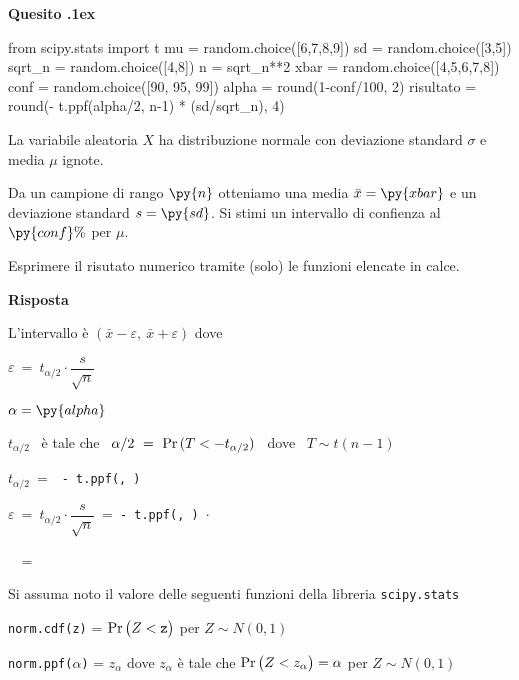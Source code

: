\documentclass[11pt,twoside,a4paper]{article}
\def\Pr{{\rm Pr\,}}
\newcounter{quesito}
\newenvironment{question}{\addtocounter{quesito}{1}\bigskip\bigskip\par\textbf{Quesito \thequesito.\kern1ex}}{\vspace{\parskip}}
\newenvironment{answer}{\par\textbf{Risposta\quad}}{\vspace{\parskip}}
\begin{document}
\begin{question} 
\begin{pycode}
from scipy.stats import t
mu = random.choice([6,7,8,9])
sd = random.choice([3,5])
sqrt_n = random.choice([4,8])
n = sqrt_n**2
xbar =  random.choice([4,5,6,7,8])
conf = random.choice([90, 95, 99])
alpha = round(1-conf/100, 2)
risultato = round(- t.ppf(alpha/2, n-1) * (sd/sqrt_n), 4)
\end{pycode}
La variabile aleatoria $X$ ha distribuzione normale con deviazione standard $\sigma$ e media $\mu$ ignote.

Da un campione di rango $\py{n}$ otteniamo una media $\bar x=\py{xbar}$ e un deviazione standard $s=\py{sd}$. Si stimi un intervallo di confienza al $\py{conf}\%$ per $\mu$.

Esprimere il risutato numerico tramite (solo) le funzioni elencate in calce.
\begin{answer}


L'intervallo è $(\bar x-\varepsilon,\ \bar x+\varepsilon)$ dove

$\varepsilon\ =\ t_{\alpha/2}\cdot\dfrac{s}{\sqrt{n}}$ 

$\alpha = \py{alpha}$

$t_{\alpha/2}$ \ è tale che \ $\alpha/2\ =\ \Pr(T<-t_{\alpha/2})$ \ dove \ $T\sim t(n-1)$

$t_{\alpha/2}\ =\ $\ {\tt - t.ppf(, )}

$\varepsilon\ =\ t_{\alpha/2}\cdot\dfrac{s}{\sqrt{n}}\ =\ ${\color{blue}\tt - t.ppf(, ) $\cdot$ }

$\phantom{\varepsilon}$\ =\ {\tt {}}
\end{answer}
\end{question}








\vfill
\hrulefill

Si assuma noto il valore delle seguenti funzioni della libreria {\tt scipy.stats\/}

{\tt norm.cdf(z)} = $\Pr\big(Z<{\tt z}\big)$ per $Z\sim N(0,1)$ 

{\tt norm.ppf($\alpha$)} = $z_\alpha$ dove $z_\alpha$ è tale che $\Pr\big(Z<z_\alpha\big)=\alpha$ per $Z\sim N(0,1)$ 
\end{document}
